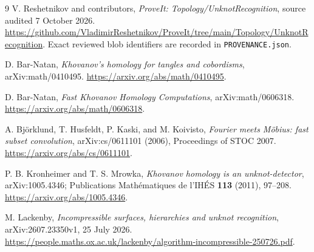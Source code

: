 \documentclass[11pt,letterpaper]{article}
\theoremstyle{definition}
\theoremstyle{remark}
\begin{document}
\begin{thebibliography}{9}
V. Reshetnikov and contributors,
\emph{ProveIt: Topology/UnknotRecognition}, source audited 7 October 2026.
\url{https://github.com/VladimirReshetnikov/ProveIt/tree/main/Topology/UnknotRecognition}.
Exact reviewed blob identifiers are recorded in \texttt{PROVENANCE.json}.

D. Bar-Natan,
\emph{Khovanov's homology for tangles and cobordisms},
arXiv:math/0410495.
\url{https://arxiv.org/abs/math/0410495}.

D. Bar-Natan,
\emph{Fast Khovanov Homology Computations},
arXiv:math/0606318.
\url{https://arxiv.org/abs/math/0606318}.

A. Bj\"orklund, T. Husfeldt, P. Kaski, and M. Koivisto,
\emph{Fourier meets M\"obius: fast subset convolution},
arXiv:cs/0611101 (2006), Proceedings of STOC 2007.
\url{https://arxiv.org/abs/cs/0611101}.

P. B. Kronheimer and T. S. Mrowka,
\emph{Khovanov homology is an unknot-detector},
arXiv:1005.4346;
Publications Math\'ematiques de l'IH\'ES \textbf{113} (2011), 97--208.
\url{https://arxiv.org/abs/1005.4346}.

M. Lackenby,
\emph{Incompressible surfaces, hierarchies and unknot recognition},
arXiv:2607.23350v1, 25 July 2026.
\url{https://people.maths.ox.ac.uk/lackenby/algorithm-incompressible-250726.pdf}.
\end{thebibliography}
\end{document}
